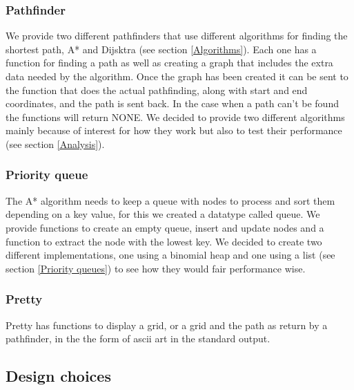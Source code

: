 \documentclass[12pt, a4paper]{article}
\begin{document}
\subsubsection{Pathfinder}
We provide two different pathfinders that use different algorithms for finding the shortest path, A* and Dijsktra (see section \ref{Algorithms}). Each one has a function for finding a path as well as creating a graph that includes the extra data needed by the algorithm. Once the graph has been created it can be sent to the function that does the actual pathfinding, along with start and end coordinates, and the path is sent back. In the case when a path can't be found the functions will return NONE. We decided to provide two different algorithms mainly because of interest for how they work but also to test their performance (see section \ref{Analysis}).

\subsubsection{Priority queue}
The A* algorithm needs to keep a queue with nodes to process and sort them depending on a key value, for this we created a datatype called queue. We provide functions to create an empty queue, insert and update nodes and a function to extract the node with the lowest key. We decided to create two different implementations, one using a binomial heap and one using a list (see section \ref{Priority queues}) to see how they would fair performance wise.

\subsubsection{Pretty}
Pretty has functions to display a grid, or a grid and the path as return by a pathfinder, in the the form of ascii art in the standard output.






\subsection{Design choices}
\end{document}
